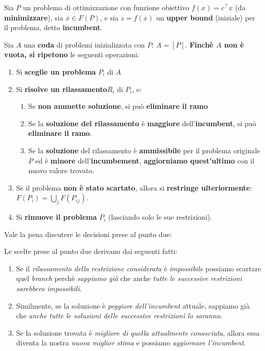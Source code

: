 \begin{definition}
    Sia $P$ un problema di ottimizzazione con funzione obiettivo $f(x)=c^\top x$ 
    (da \textbf{minimizzare}), sia $\overline{x}\in F(P)$, e sia
    $z=f(\overline{x})$ un \textbf{upper bound} (iniziale) per il problema,
    detto \textbf{incumbent}.

    Sia $A$ una \textbf{coda} di problemi inizializzata con $P$: $A=[P]$.
    \textbf{Finchè $A$ non è vuota, si ripetono} le seguenti operazioni:
    \begin{enumerate}
        \item Si \textbf{sceglie un problema} $P_i$ di $A$
        \item Si \textbf{risolve un rilassamento}$R_i$ di $P_i$, e:
            \begin{enumerate}
                \item Se \textbf{non ammette soluzione}, si può 
                    \textbf{eliminare il ramo}
                \item Se la \textbf{soluzione del rilassamento} è \textbf{maggiore}
                    dell'\textbf{incumbent}, si può \textbf{eliminare il ramo}.
                \item Se la \textbf{soluzione} del rilassamento è 
                    \textbf{ammissibile} per il problema originale $P$ ed
                    è \textbf{minore} dell'\textbf{incumbement}, \textbf{aggiorniamo
                    quest'ultimo} con il nuovo valore trovato.
            \end{enumerate}
        \item Se il problema \textbf{non è stato scartato}, allora si \textbf{restringe
            ulteriormente}: $F(P_i)=\bigcup_j F(P_{ij})$.
        \item Si \textbf{rimuove il problema} $P_i$ (lasciando solo le sue restrizioni).
    \end{enumerate}
\end{definition}

Vale la pena discutere le decisioni prese al punto due:

\begin{remark}
    Le scelte prese al punto due derivano dai seguenti fatti:
    \begin{enumerate}
        \item Se il \textit{rilassamento della restrizione considerata} è \textit{impossibile}
            possiamo scartare quel \textit{branch} perchè \textit{sappiamo già} che 
            anche \textit{tutte le successive restrizioni sarebbero impossibili}.
        \item Similmente, se la soluzione è \textit{peggiore dell'incumbent} attuale,
            sappiamo già che \textit{anche tutte le soluzioni delle successive
            restrizioni lo saranno}.
        \item Se la soluzione trovata è \textit{migliore di quella attualmente 
            conosciuta}, allora essa diventa la nostra \textit{nuova miglior stima} 
            e possiamo \textit{aggiornare l'incumbent}.
    \end{enumerate}
\end{remark}

